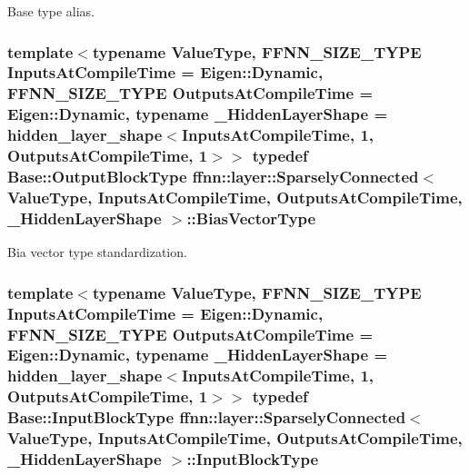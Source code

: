 Base type alias. 

\hypertarget{classffnn_1_1layer_1_1_sparsely_connected_a2ff479719bf630de3957b72e9691893b}{
\subsubsection[{Bias\-Vector\-Type}]{\setlength{\rightskip}{0pt plus 5cm}template$<$typename Value\-Type, F\-F\-N\-N\-\_\-\-S\-I\-Z\-E\-\_\-\-T\-Y\-P\-E Inputs\-At\-Compile\-Time = Eigen\-::\-Dynamic, F\-F\-N\-N\-\_\-\-S\-I\-Z\-E\-\_\-\-T\-Y\-P\-E Outputs\-At\-Compile\-Time = Eigen\-::\-Dynamic, typename \-\_\-\-Hidden\-Layer\-Shape = hidden\-\_\-layer\-\_\-shape$<$\-Inputs\-At\-Compile\-Time, 1, Outputs\-At\-Compile\-Time, 1$>$$>$ typedef {\bf Base\-::\-Output\-Block\-Type} {\bf ffnn\-::layer\-::\-Sparsely\-Connected}$<$ Value\-Type, Inputs\-At\-Compile\-Time, Outputs\-At\-Compile\-Time, \-\_\-\-Hidden\-Layer\-Shape $>$\-::{\bf Bias\-Vector\-Type}}}\label{classffnn_1_1layer_1_1_sparsely_connected_a2ff479719bf630de3957b72e9691893b}


Bia vector type standardization. 

\hypertarget{classffnn_1_1layer_1_1_sparsely_connected_ab405e0e2248096b07511cdc4a64d0126}{
\subsubsection[{Input\-Block\-Type}]{\setlength{\rightskip}{0pt plus 5cm}template$<$typename Value\-Type, F\-F\-N\-N\-\_\-\-S\-I\-Z\-E\-\_\-\-T\-Y\-P\-E Inputs\-At\-Compile\-Time = Eigen\-::\-Dynamic, F\-F\-N\-N\-\_\-\-S\-I\-Z\-E\-\_\-\-T\-Y\-P\-E Outputs\-At\-Compile\-Time = Eigen\-::\-Dynamic, typename \-\_\-\-Hidden\-Layer\-Shape = hidden\-\_\-layer\-\_\-shape$<$\-Inputs\-At\-Compile\-Time, 1, Outputs\-At\-Compile\-Time, 1$>$$>$ typedef Base\-::\-Input\-Block\-Type {\bf ffnn\-::layer\-::\-Sparsely\-Connected}$<$ Value\-Type, Inputs\-At\-Compile\-Time, Outputs\-At\-Compile\-Time, \-\_\-\-Hidden\-Layer\-Shape $>$\-::{\bf Input\-Block\-Type}}}\label{classffnn_1_1layer_1_1_sparsely_connected_ab405e0e2248096b07511cdc4a64d0126}


